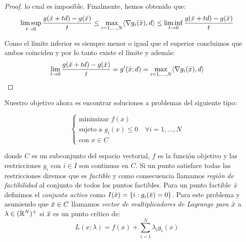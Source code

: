 \begin{proof}
		lo cual es imposible. Finalmente, hemos obtenido que:
		\[
		\limsup_{t\rightarrow0}\frac{g(\bar{x}+td) - g(\bar{x})}{t} \leq \max_{i=1,...,N}\langle \nabla g_i(\bar{x}), d \rangle \leq 	\liminf_{t\rightarrow0}\frac{g(\bar{x}+td) - g(\bar{x})}{t}
		\]
		
		Como el límite inferior es siempre menor o igual que el superior concluimos que ambos coinciden y por lo tanto existe el límite y además:
		\[
		\lim_{t\rightarrow0}\frac{g(\bar{x}+td) - g(\bar{x})}{t} = g'(\bar{x};d) = \max_{i=1,...,N}\langle \nabla g_i(\bar{x}), d \rangle
		\]
	\end{proof}

	Nuestro objetivo ahora es encontrar soluciones a problemas del siguiente tipo:
	
		\begin{equation}\label{probMin}
		\begin{cases}
		\text{minimizar } f(x)\\
		\text{sujeto a } g_i(x) \leq 0 \quad \forall i =1,...,N\\
		\text{con }x \in C
		\end{cases} 
		\end{equation}
		
		donde $ C $ es un subconjunto del espacio vectorial, $ f  $ es la función objetivo y las restricciones $ g_i $ con $ i \in I $ son continuas en $ C $. Si un punto satisface todas las restricciones diremos que es \textit{factible}  y como consecuencia llamamos \textit{región de factibilidad} al conjunto de todos los puntos factibles. Para un punto factible $ \bar{x} $ definimos el \textit{conjunto activo} como $ I(\bar{x}) = \{i: g_i(\bar{x}) = 0\}$. Para este problema y asumiendo que $ \bar{x} \in C $ llamamos \textit{vector de multiplicadores de Lagrange para $ \bar{x} $} a $ \lambda \in (\mathbb{R}^N)^+ $ si $ \bar{x} $ es un punto crítico de:
		\[
		L(x;\lambda) = f(x) + \sum_{i=1}^{N} \lambda_i g_i(x)
		\]
		
